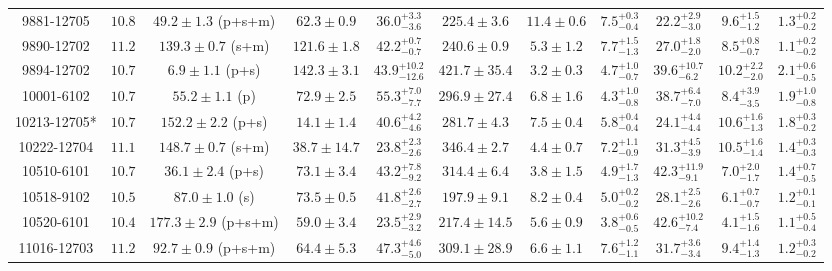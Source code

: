 \begin{landscape}
\begin{longtable}{ccccccccccc}
9881-12705 & $10.8$  & $49.2 \pm 1.3$ (p+s+m)  & $62.3 \pm 0.9$ & $36.0^{+3.3}_{-3.6}$  & $225.4 \pm 3.6 $ & $11.4 \pm 0.6 $ & $7.5^{+0.3}_{-0.4}$  & $22.2^{+2.9}_{-3.0}$  & $9.6^{+1.5}_{-1.2}$  & $1.3^{+0.2}_{-0.2}$ \\ 
9890-12702 & $11.2$  & $139.3 \pm 0.7$ (s+m)  & $121.6 \pm 1.8$ & $42.2^{+0.7}_{-0.7}$  & $240.6 \pm 0.9 $ & $5.3 \pm 1.2 $ & $7.7^{+1.5}_{-1.3}$  & $27.0^{+1.8}_{-2.0}$  & $8.5^{+0.8}_{-0.7}$  & $1.1^{+0.2}_{-0.2}$ \\ 
9894-12702 & $10.7$  & $6.9 \pm 1.1$ (p+s)  & $142.3 \pm 3.1$ & $43.9^{+10.2}_{-12.6}$  & $421.7 \pm 35.4 $ & $3.2 \pm 0.3 $ & $4.7^{+1.0}_{-0.7}$  & $39.6^{+10.7}_{-6.2}$  & $10.2^{+2.2}_{-2.0}$  & $2.1^{+0.6}_{-0.5}$ \\ 
10001-6102 & $10.7$  & $55.2 \pm 1.1$ (p)  & $72.9 \pm 2.5$ & $55.3^{+7.0}_{-7.7}$  & $296.9 \pm 27.4 $ & $6.8 \pm 1.6 $ & $4.3^{+1.0}_{-0.8}$  & $38.7^{+6.4}_{-7.0}$  & $8.4^{+3.9}_{-3.5}$  & $1.9^{+1.0}_{-0.8}$ \\ 
10213-12705* & $10.7$  & $152.2 \pm 2.2$ (p+s)  & $14.1 \pm 1.4$ & $40.6^{+4.2}_{-4.6}$  & $281.7 \pm 4.3 $ & $7.5 \pm 0.4 $ & $5.8^{+0.4}_{-0.4}$  & $24.1^{+4.4}_{-4.4}$  & $10.6^{+1.6}_{-1.3}$  & $1.8^{+0.3}_{-0.2}$ \\ 
10222-12704 & $11.1$  & $148.7 \pm 0.7$ (s+m)  & $38.7 \pm 14.7$ & $23.8^{+2.3}_{-2.6}$  & $346.4 \pm 2.7 $ & $4.4 \pm 0.7 $ & $7.2^{+1.1}_{-0.9}$  & $31.3^{+4.5}_{-3.9}$  & $10.5^{+1.6}_{-1.4}$  & $1.4^{+0.3}_{-0.3}$ \\ 
10510-6101 & $10.7$  & $36.1 \pm 2.4$ (p+s)  & $73.1 \pm 3.4$ & $43.2^{+7.8}_{-9.2}$  & $314.4 \pm 6.4 $ & $3.8 \pm 1.5 $ & $4.9^{+1.7}_{-1.3}$  & $42.3^{+11.9}_{-9.1}$  & $7.0^{+2.0}_{-1.7}$  & $1.4^{+0.7}_{-0.5}$ \\ 
10518-9102 & $10.5$  & $87.0 \pm 1.0$ (s)  & $73.5 \pm 0.5$ & $41.8^{+2.6}_{-2.7}$  & $197.9 \pm 9.1 $ & $8.2 \pm 0.4 $ & $5.0^{+0.2}_{-0.2}$  & $28.1^{+2.5}_{-2.6}$  & $6.1^{+0.7}_{-0.7}$  & $1.2^{+0.1}_{-0.1}$ \\ 
10520-6101 & $10.4$  & $177.3 \pm 2.9$ (p+s+m)  & $59.0 \pm 3.4$ & $23.5^{+2.9}_{-3.2}$  & $217.4 \pm 14.5 $ & $5.6 \pm 0.9 $ & $3.8^{+0.6}_{-0.5}$  & $42.6^{+10.2}_{-7.4}$  & $4.1^{+1.5}_{-1.6}$  & $1.1^{+0.5}_{-0.4}$ \\ 
11016-12703 & $11.2$  & $92.7 \pm 0.9$ (p+s+m)  & $64.4 \pm 5.3$ & $47.3^{+4.6}_{-5.0}$  & $309.1 \pm 28.9 $ & $6.6 \pm 1.1 $ & $7.6^{+1.2}_{-1.1}$  & $31.7^{+3.6}_{-3.4}$  & $9.4^{+1.4}_{-1.3}$  & $1.2^{+0.3}_{-0.2}$ \\ 

\end{longtable}
\end{landscape}

